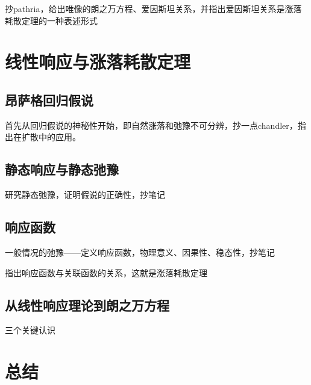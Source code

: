抄pathria，给出唯像的朗之万方程、爱因斯坦关系，并指出爱因斯坦关系是涨落耗散定理的一种表述形式

\section{线性响应与涨落耗散定理}

\subsection{昂萨格回归假说}

首先从回归假说的神秘性开始，即自然涨落和弛豫不可分辨，抄一点chandler，指出在扩散中的应用。

\subsection{静态响应与静态弛豫}

研究静态弛豫，证明假说的正确性，抄笔记

\subsection{响应函数}

一般情况的弛豫——定义响应函数，物理意义、因果性、稳态性，抄笔记

指出响应函数与关联函数的关系，这就是涨落耗散定理

\subsection{从线性响应理论到朗之万方程}

三个关键认识

\section{总结}
